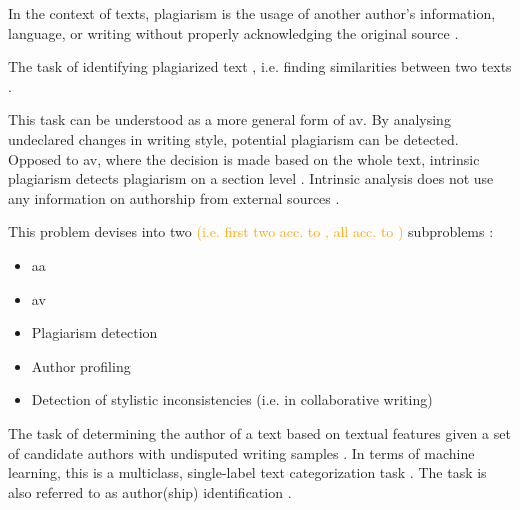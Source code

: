\begin{definition}
    [Plagiarism]
    In the context of texts, plagiarism is the usage of another author's information, language, or writing without properly acknowledging the original source \cite{stein_intrinsic_2011}.
\end{definition}

\begin{definition}
    The task of identifying plagiarized text \cite{stein_intrinsic_2011}, i.e. finding similarities between two texts \cite{stamatatos_survey_2009}.
\end{definition}

\begin{definition}
    This task can be understood as a more general form of \ac{av}.
    By analysing undeclared changes in writing style, potential plagiarism can be detected.
    Opposed to \ac{av}, where the decision is made based on the whole text, 
    intrinsic plagiarism detects plagiarism on a section level \cite{stein_intrinsic_2011}.
    Intrinsic analysis does not use any information on authorship from external sources \cite{zangerle_overview_2024}.
\end{definition}

\begin{definition}
    This problem devises into two \textcolor{orange}{(i.e. first two acc. to \cite{stein_intrinsic_2011}, all acc. to \cite{stamatatos_survey_2009})} subproblems \cite{stein_intrinsic_2011}:
    \begin{itemize}
        \item \ac{aa} \cite{stein_intrinsic_2011}
        \item \ac{av} \cite{stein_intrinsic_2011,stamatatos_survey_2009}
        \item Plagiarism detection \cite{stamatatos_survey_2009}
        \item Author profiling \cite{stamatatos_survey_2009}
        \item Detection of stylistic inconsistencies (i.e. in collaborative writing) \cite{stamatatos_survey_2009}
    \end{itemize}
\end{definition}

\begin{definition}
    [\ac{aa}]
    The task of determining the author of a text based on textual features 
    given a set of candidate authors with undisputed writing samples \cite{stein_intrinsic_2011,stamatatos_survey_2009}.
    In terms of machine learning, this is a multiclass, single-label text categorization task \cite{stamatatos_survey_2009}.
    The task is also referred to as author(ship) identification \cite{stamatatos_survey_2009}.
\end{definition}

